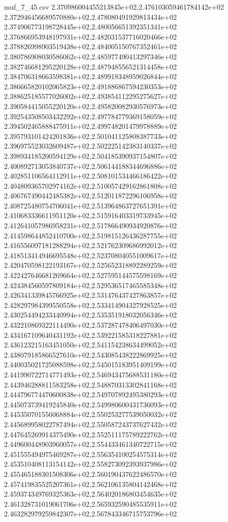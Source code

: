 \begin{filecontents*}{muf_7_45.csv}
2.370986004455213845e+02,2.476103059461784142e+02
2.372946456689570880e+02,2.478080491929813434e+02
2.374906773198728445e+02,2.480056651392351341e+02
2.376866953948197931e+02,2.482031537716020466e+02
2.378826998903519438e+02,2.484005150767352461e+02
2.380786908030586062e+02,2.485977490413297346e+02
2.382746681295220128e+02,2.487948556521314458e+02
2.384706318663598381e+02,2.489918348959026844e+02
2.386665820102065823e+02,2.491886867594230353e+02
2.388625185577026002e+02,2.493854112295275627e+02
2.390584415055220120e+02,2.495820082930576973e+02
2.392543508503432292e+02,2.497784779369158059e+02
2.394502465888475911e+02,2.499748201479978889e+02
2.395793101424201836e+02,2.501041125808387733e+02
2.396975523032609487e+02,2.502225142383140337e+02
2.398934185200594129e+02,2.504185390937154807e+02
2.400892713053840737e+02,2.506144188344696886e+02
2.402851106564112911e+02,2.508101534466186422e+02
2.404809365702974162e+02,2.510057429162861808e+02
2.406767490442485382e+02,2.512011872296106958e+02
2.408725480754706041e+02,2.513964863727651391e+02
2.410683336611951120e+02,2.515916403319733945e+02
2.412641057986958231e+02,2.517866490934920876e+02
2.414598644852410700e+02,2.519815126436287755e+02
2.416556097181288294e+02,2.521762309686992012e+02
2.418513414946695548e+02,2.523708040551009617e+02
2.420470598122193167e+02,2.525652318892289259e+02
2.422427646681269664e+02,2.527595144575598169e+02
2.424384560597809184e+02,2.529536517465585348e+02
2.426341339845766925e+02,2.531476437427863857e+02
2.428297984399550558e+02,2.533414904327928525e+02
2.430254494233440994e+02,2.535351918032056346e+02
2.432210869322114490e+02,2.537287478406497030e+02
2.434167109640431192e+02,2.539221585318227881e+02
2.436123215163451050e+02,2.541154238634499052e+02
2.438079185866527610e+02,2.543085438222869925e+02
2.440035021725088598e+02,2.545015183951409199e+02
2.441990722714771493e+02,2.546943475688531180e+02
2.443946288811583258e+02,2.548870313302841168e+02
2.444796774470600838e+02,2.549707892495380293e+02
2.445073739419245840e+02,2.549980600431736093e+02
2.445350701556068884e+02,2.550253277539050032e+02
2.445689958022787494e+02,2.550587243737627432e+02
2.447645269914375490e+02,2.552511175789222762e+02
2.449600448903960057e+02,2.554433461340722715e+02
2.451555494975469287e+02,2.556354100254575314e+02
2.453510408113154142e+02,2.558273092393937986e+02
2.455465188301508306e+02,2.560190437622486570e+02
2.457419835525207361e+02,2.562106135804142468e+02
2.459374349769325363e+02,2.564020186803454635e+02
2.461328731019061706e+02,2.565932590485535911e+02
2.463282979259842307e+02,2.567843346715753796e+02

\end{filecontents*}
